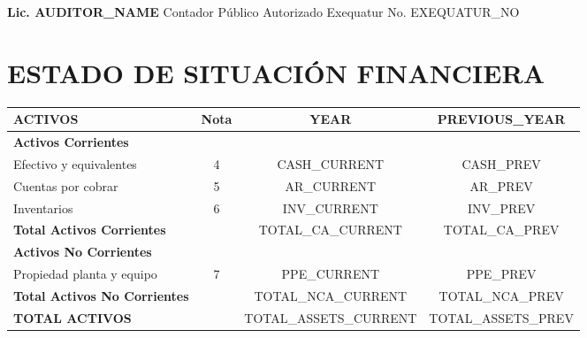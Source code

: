 \documentclass[10pt,letterpaper]{article}
\begin{document}
\vspace{1cm}

\textbf{Lic. {{AUDITOR_NAME}}}  
Contador Público Autorizado  
Exequatur No. {{EXEQUATUR_NO}}  

\newpage


\section{ESTADO DE SITUACIÓN FINANCIERA}

\begin{tabularx}{\textwidth}{X c S S}

\toprule
\textbf{ACTIVOS} & Nota & {{{YEAR}}} & {{{PREVIOUS_YEAR}}} \\
\midrule

\textbf{Activos Corrientes} & & & \\

Efectivo y equivalentes & 4 & {{CASH_CURRENT}} & {{CASH_PREV}} \\
Cuentas por cobrar & 5 & {{AR_CURRENT}} & {{AR_PREV}} \\
Inventarios & 6 & {{INV_CURRENT}} & {{INV_PREV}} \\

\textbf{Total Activos Corrientes} & & {{TOTAL_CA_CURRENT}} & {{TOTAL_CA_PREV}} \\

\addlinespace

\textbf{Activos No Corrientes} & & & \\

Propiedad planta y equipo & 7 & {{PPE_CURRENT}} & {{PPE_PREV}} \\

\textbf{Total Activos No Corrientes} & & {{TOTAL_NCA_CURRENT}} & {{TOTAL_NCA_PREV}} \\

\midrule

\textbf{TOTAL ACTIVOS} & & {{TOTAL_ASSETS_CURRENT}} & {{TOTAL_ASSETS_PREV}} \\

\bottomrule
\end{tabularx}

\vspace{1cm}
\end{document}
